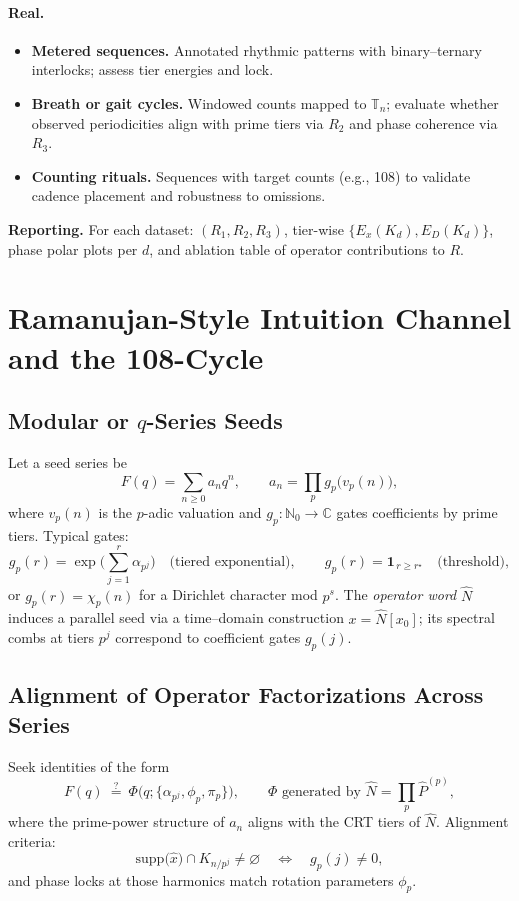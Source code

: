 \documentclass[12pt]{article}
\numberwithin{equation}{section}
\theoremstyle{plain}
\theoremstyle{definition}
\theoremstyle{remark}
\begin{document}
\paragraph{Real.}
\begin{itemize}
  \item \textbf{Metered sequences.} Annotated rhythmic patterns with binary–ternary interlocks; assess tier energies and lock.
  \item \textbf{Breath or gait cycles.} Windowed counts mapped to $\mathbb{T}_n$; evaluate whether observed periodicities align with prime tiers via $R_2$ and phase coherence via $R_3$.
  \item \textbf{Counting rituals.} Sequences with target counts (e.g., 108) to validate cadence placement and robustness to omissions.
\end{itemize}

\noindent\textbf{Reporting.} For each dataset: $(R_1,R_2,R_3)$, tier-wise $\{E_x(K_d),E_D(K_d)\}$, phase polar plots per $d$, and ablation table of operator contributions to $R$.

\section*{Ramanujan-Style Intuition Channel and the 108-Cycle}

\subsection*{Modular or $q$-Series Seeds}
Let a seed series be
\[
F(q)=\sum_{n\ge 0} a_n q^n,\qquad a_n=\prod_{p} g_p\big(v_p(n)\big),
\]
where $v_p(n)$ is the $p$-adic valuation and $g_p:\mathbb{N}_0\to \mathbb{C}$ gates coefficients by prime tiers. Typical gates:
\[
g_p(r)=\exp\!\Big(\sum_{j=1}^{r}\alpha_{p^j}\Big)\quad\text{(tiered exponential)},\qquad
g_p(r)=\mathbf{1}_{\,r\ge r^\star}\quad\text{(threshold)},
\]
or $g_p(r)=\chi_p(n)$ for a Dirichlet character mod $p^s$. The \emph{operator word} $\widehat{N}$ induces a parallel seed via a time–domain construction $x=\widehat{N}[x_0]$; its spectral combs at tiers $p^j$ correspond to coefficient gates $g_p(j)$.

\subsection*{Alignment of Operator Factorizations Across Series}
Seek identities of the form
\[
F(q)\ \stackrel{?}{=}\ \Phi\!\big(q;\{\alpha_{p^j},\phi_p,\pi_p\}\big),\qquad
\Phi \text{ generated by }\widehat{N}=\prod_{p}\hat{P}^{(p)},
\]
where the prime-power structure of $a_n$ aligns with the CRT tiers of $\widehat{N}$. Alignment criteria:
\[
\mathrm{supp}\big(\widehat{x}\big)\cap K_{n/p^j}\neq \varnothing\quad \Longleftrightarrow\quad g_p(j)\neq 0,
\]
and phase locks at those harmonics match rotation parameters $\phi_p$.
\end{document}
